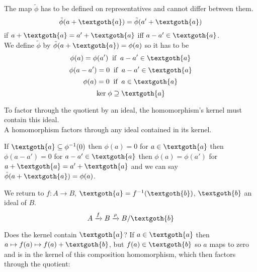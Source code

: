 \documentclass{article}
\begin{document}

\noindend
The map $\tilde{\phi}$ has to be defined on representatives and cannot differ between them.
\[
  \tilde{\phi}(a + \textgoth{a}) = \tilde{\phi}(a' + \textgoth{a})
\]
if $a + \textgoth{a} = a' + \textgoth{a}$ iff $a - a' \in \textgoth{a}$. \\
We define $\tilde{\phi}$ by $\tilde{\phi}(a + \textgoth{a}) = \phi(a)$ so it has to be
\[
  \phi(a) = \phi(a') \;\; \text{if} \;\; a - a' \in \textgoth{a} 
\]
\[
  \phi(a - a') = 0 \;\; \text{if} \;\; a - a' \in \textgoth{a}
\]
\[
  \phi(a) = 0 \;\; \text{if} \;\; a \in \textgoth{a}
\]
\[
  \textrm{ker} \; \phi \supseteq \textgoth{a}
\]

\noindent
To factor through the quotient by an ideal, the homomorphism's kernel must contain this ideal. \\
A homomorphism factors through any ideal contained in its kernel.

If $\textgoth{a} \subseteq \phi^{-1}(0)$ then $\phi(a) = 0$ for $a \in \textgoth{a}$ then $\phi(a - a') = 0$ for $a - a' \in \textgoth{a}$ then $\phi(a) = \phi(a')$ for $a + \textgoth{a} = a' + \textgoth{a}$ and we can say $\tilde{\phi}(a + \textgoth{a}) = \phi(a)$.

We return to $f: A \rightarrow B$, $\textgoth{a} = f^{-1}(\textgoth{b})$, $\textgoth{b}$ an ideal of $B$.
\[
  A \xrightarrow{f} B \xrightarrow{\rho} B/\textgoth{b}
\]

\noindent

Does the kernel contain $\textgoth{a}$? If $a \in \textgoth{a}$ then $a \mapsto f(a) \mapsto f(a) + \textgoth{b}$, but $f(a) \in \textgoth{b}$ so $a$ maps to zero and is in the kernel of this composition homomorphism, which then factors through the quotient:


\end{document}
